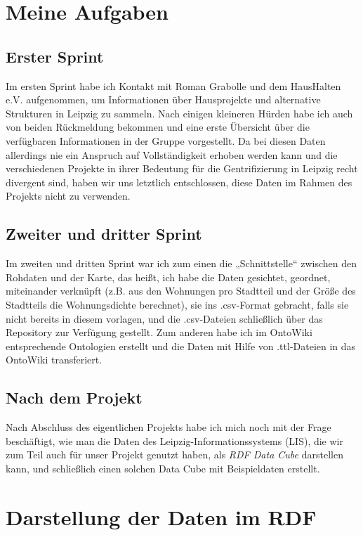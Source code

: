 \documentclass[a4paper,11pt]{article}
\begin{document}
\section{Meine Aufgaben}

\subsection{Erster Sprint}

Im ersten Sprint habe ich Kontakt mit Roman Grabolle und dem HausHalten
e.V. aufgenommen, um Informationen über Hausprojekte und alternative
Strukturen in Leipzig zu sammeln. Nach einigen kleineren Hürden habe ich auch
von beiden Rückmeldung bekommen und eine erste Übersicht über die verfügbaren
Informationen in der Gruppe vorgestellt. Da bei diesen Daten allerdings nie
ein Anspruch auf Vollständigkeit erhoben werden kann und die verschiedenen
Projekte in ihrer Bedeutung für die Gentrifizierung in Leipzig recht divergent
sind, haben wir uns letztlich entschlossen, diese Daten im Rahmen des Projekts
nicht zu verwenden. 

\subsection{Zweiter und dritter Sprint}

Im zweiten und dritten Sprint war ich zum einen die „Schnittstelle“
zwischen den Rohdaten und der Karte, das heißt, ich habe die Daten gesichtet,
geordnet, miteinander verknüpft (z.B. aus den Wohnungen pro Stadtteil und der
Größe des Stadtteils die Wohnungsdichte berechnet), sie ins .csv-Format
gebracht, falls sie nicht bereits in diesem vorlagen, und die .csv-Dateien
schließlich über das Repository zur Verfügung gestellt. Zum anderen habe ich
im OntoWiki entsprechende Ontologien erstellt und die Daten mit Hilfe von
.ttl-Dateien in das OntoWiki transferiert.  

\subsection{Nach dem Projekt}

Nach Abschluss des eigentlichen Projekts habe ich mich noch mit der Frage
beschäftigt, wie man die Daten des Leipzig-Informationssystems (LIS), die wir
zum Teil auch für unser Projekt genutzt haben, als \emph{RDF Data Cube}
darstellen kann, und schließlich einen solchen Data Cube mit Beispieldaten
erstellt.

\section{Darstellung der Daten im RDF}
\end{document}
